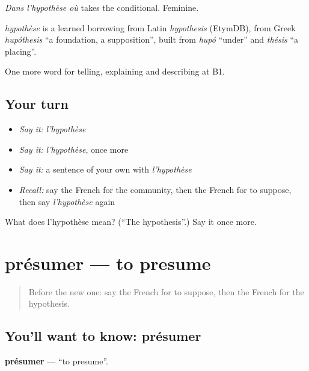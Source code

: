\emph{Dans l'hypothèse où} takes the conditional. Feminine.

\begin{cousinweb}
\emph{hypothèse} is a learned borrowing from Latin \emph{hypothesis} (EtymDB), from Greek \emph{hupóthesis} \textquotedblleft{}a foundation, a supposition\textquotedblright{}, built from \emph{hupó} \textquotedblleft{}under\textquotedblright{} and \emph{thésis} \textquotedblleft{}a placing\textquotedblright{}.
\end{cousinweb}

\begin{grammarlens}[title={What you've built}]
One more word for telling, explaining and describing at B1.
\end{grammarlens}

\subsection*{Your turn}
\begin{itemize}
\raggedright
  \item \emph{Say it:} \emph{l'hypothèse}
  \item \emph{Say it:} \emph{l'hypothèse}, once more
  \item \emph{Say it:} a sentence of your own with \emph{l'hypothèse}
  \item \emph{Recall:} say the French for the community, then the French for to suppose, then say \emph{l'hypothèse} again
\end{itemize}

\begin{tcolorbox}[breakable,colback=teal!4,colframe=teal!35!black,title={Before you move on}]
What does l'hypothèse mean? (\textquotedblleft{}The hypothesis\textquotedblright{}.) Say it once more.
\end{tcolorbox}
\section[présumer]{présumer — to presume}

\label{lesson:FR-C367-presumer}



\begin{quote}
Before the new one: say the French for to suppose, then the French for the hypothesis.
\end{quote}

\subsection*{You'll want to know: présumer}
\textbf{présumer} — \textquotedblleft{}to presume\textquotedblright{}.

